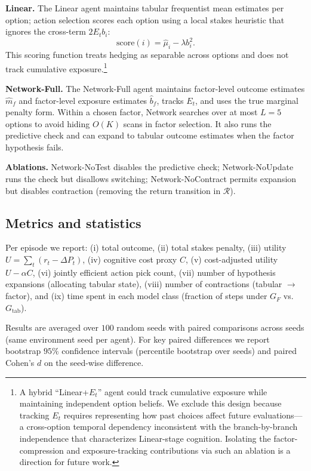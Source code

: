 \documentclass[11pt]{article}
\begin{document}
\textbf{Linear.} The Linear agent maintains tabular frequentist mean estimates per option; action selection scores each option using a local stakes heuristic that ignores the cross-term $2E_tb_i$:
\[
\text{score}(i) = \widehat{\mu}_i - \lambda b_i^2.
\]
This scoring function treats hedging as separable across options and does not track cumulative exposure.\footnote{A hybrid ``Linear+$E_t$'' agent could track cumulative exposure while maintaining independent option beliefs. We exclude this design because tracking $E_t$ requires representing how past choices affect future evaluations---a cross-option temporal dependency inconsistent with the branch-by-branch independence that characterizes Linear-stage cognition. Isolating the factor-compression and exposure-tracking contributions via such an ablation is a direction for future work.}

\textbf{Network-Full.} The Network-Full agent maintains factor-level outcome estimates $\widehat{m}_f$ and factor-level exposure estimates $\widehat{b}_f$, tracks $E_t$, and uses the true marginal penalty form. Within a chosen factor, Network searches over at most $L{=}5$ options to avoid hiding $O(K)$ scans in factor selection. It also runs the predictive check and can expand to tabular outcome estimates when the factor hypothesis fails.

\textbf{Ablations.} Network-NoTest disables the predictive check; Network-NoUpdate runs the check but disallows switching; Network-NoContract permits expansion but disables contraction (removing the return transition in $\mathcal{R}$).

\subsection{Metrics and statistics}

Per episode we report:
(i) total outcome, (ii) total stakes penalty, (iii) utility $U=\sum_t (r_t-\Delta P_t)$,
(iv) cognitive cost proxy $C$, (v) cost-adjusted utility $U-\alpha C$,
(vi) jointly efficient action pick count, (vii) number of hypothesis expansions (allocating tabular state), (viii) number of contractions (tabular $\rightarrow$ factor), and (ix) time spent in each model class (fraction of steps under $G_F$ vs.\ $G_{\mathrm{tab}}$).

Results are averaged over $100$ random seeds with paired comparisons across seeds (same environment seed per agent). For key paired differences we report bootstrap $95\%$ confidence intervals (percentile bootstrap over seeds) and paired Cohen's $d$ on the seed-wise difference.
\end{document}
